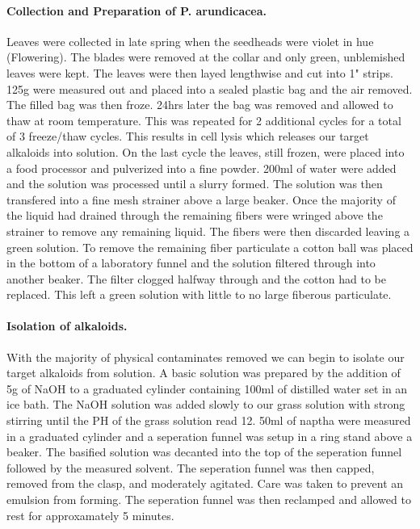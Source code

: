 \documentclass[12pt, a4paper]{article}
\begin{document}
\paragraph{Collection and Preparation of P. arundicacea.}
    Leaves were collected in late spring when the seedheads were violet in hue (Flowering). The blades were removed at the collar and only green, unblemished leaves were kept.
    The leaves were then layed lengthwise and cut into 1" strips. 125g were measured out and placed into a sealed plastic bag and the air removed. The filled bag was then froze.
    24hrs later the bag was removed and allowed to thaw at room temperature. This was repeated for 2 additional cycles for a total of 3 freeze/thaw cycles.
    This results in cell lysis which releases our target alkaloids into solution. On the last cycle the leaves, still frozen, were placed into a food processor and pulverized into a fine powder. 
    200ml of water were added and the solution was processed until a slurry formed. The solution was then transfered into a fine mesh strainer above a large beaker.
    Once the majority of the liquid had drained through the remaining fibers were wringed above the strainer to remove any remaining liquid.
    The fibers were then discarded leaving a green solution. 
    To remove the remaining fiber particulate a cotton ball was placed in the bottom of a laboratory funnel and the solution filtered through into another beaker.
    The filter clogged halfway through and the cotton had to be replaced. This left a green solution with little to no large fiberous particulate.

\paragraph{Isolation of alkaloids.}
    With the majority of physical contaminates removed we can begin to isolate our target alkaloids from solution. 
    A basic solution was prepared by the addition of 5g of NaOH to a graduated cylinder containing 100ml of distilled water set in an ice bath.
    The NaOH solution was added slowly to our grass solution with strong stirring until the PH of the grass solution read 12.
    50ml of naptha were measured in a graduated cylinder and a seperation funnel was setup in a ring stand above a beaker. 
    The basified solution was decanted into the top of the seperation funnel followed by the measured solvent. 
    The seperation funnel was then capped, removed from the clasp, and moderately agitated. Care was taken to prevent an emulsion from forming.
    The seperation funnel was then reclamped and allowed to rest for approxamately 5 minutes.
    
\end{document}
